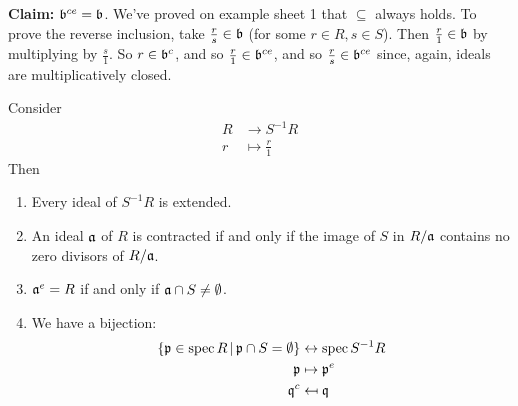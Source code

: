 \documentclass{article}
\begin{document}
\textbf{Claim:} $\mathfrak{b}^{ce} = \mathfrak{b}$. 
\proof We've proved on example sheet 1 that $\subseteq$ always holds. \gap To prove the reverse inclusion, take $\frac{r}{s} \in \mathfrak{b}$ (for some $r \in R, s \in S$). Then $\frac{r}{1} \in \mathfrak{b}$ by multiplying by $\frac{s}{1}$. So $r \in \mathfrak{b}^{c}$, and so $\frac{r}{1} \in \mathfrak{b}^{ce}$, and so $\frac{r}{s} \in \mathfrak{b}^{ce}$ since, again, ideals are multiplicatively closed.
\begin{fancyprop}{}
    Consider \begin{align*}
        R &\to S^{-1}R\\
        r &\mapsto \frac{r}{1}
    \end{align*}
    Then \begin{enumerate}
        \item Every ideal of $S^{-1}R$ is extended.
        \item An ideal $\mathfrak{a}$ of $R$ is contracted if and only if the image of $S$ in $R/ \mathfrak{a}$ contains no zero divisors of $R/\mathfrak{a}$.
        \item $\mathfrak{a}^{e}=R$ if and only if $\mathfrak{a} \cap S \neq \emptyset$.
        \item We have a bijection: 
        \begin{align*} 
            \{ \mathfrak{p} \in \operatorname{spec} R \, | \, \mathfrak{p} \cap S = \emptyset\} &\leftrightarrow \operatorname{spec} S^{-1}R\\ 
            \mathfrak{p} &\mapsto \mathfrak{p}^{e}\\
            \mathfrak{q}^{c} &\mapsfrom \mathfrak{q}
        \end{align*}
    \end{enumerate}
\end{fancyprop}
\proof \hspace{0.1cm}
\end{document}
